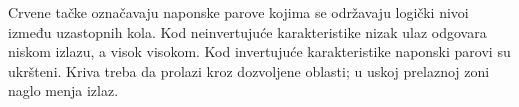 Crvene tačke označavaju naponske parove kojima se održavaju logički nivoi između uzastopnih kola. Kod neinvertujuće karakteristike nizak ulaz odgovara niskom izlazu, a visok visokom. Kod invertujuće karakteristike naponski parovi su ukršteni. Kriva treba da prolazi kroz dozvoljene oblasti; u uskoj prelaznoj zoni naglo menja izlaz.
